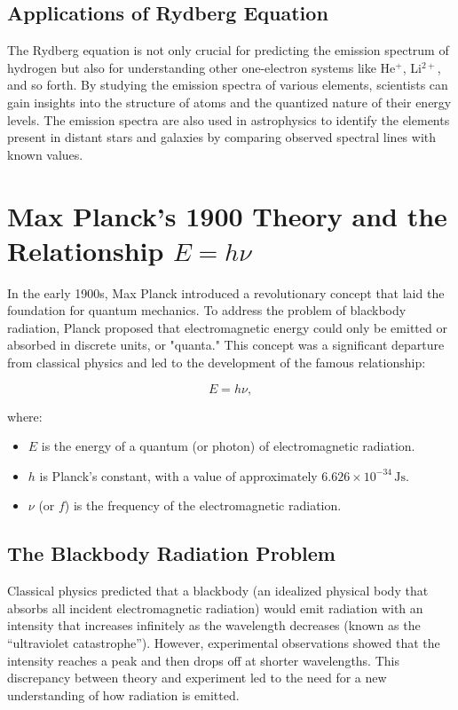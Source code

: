 \documentclass{report}
\begin{document}
\subsection{Applications of Rydberg Equation}

The Rydberg equation is not only crucial for predicting the emission spectrum of hydrogen but also for understanding other one-electron systems like He$^+$, Li$^{2+}$, and so forth. By studying the emission spectra of various elements, scientists can gain insights into the structure of atoms and the quantized nature of their energy levels. The emission spectra are also used in astrophysics to identify the elements present in distant stars and galaxies by comparing observed spectral lines with known values.

\section{Max Planck’s 1900 Theory and the Relationship $E = h\nu$}

In the early 1900s, Max Planck introduced a revolutionary concept that laid the foundation for quantum mechanics. To address the problem of blackbody radiation, Planck proposed that electromagnetic energy could only be emitted or absorbed in discrete units, or "quanta." This concept was a significant departure from classical physics and led to the development of the famous relationship:

\[
	E = h \nu,
\]

where:
\begin{itemize}
	\item $E$ is the energy of a quantum (or photon) of electromagnetic radiation.
	\item $h$ is Planck’s constant, with a value of approximately $6.626 \times 10^{-34} \, \text{Js}$.
	\item $\nu$ (or $f$) is the frequency of the electromagnetic radiation.
\end{itemize}

\subsection{The Blackbody Radiation Problem}

Classical physics predicted that a blackbody (an idealized physical body that absorbs all incident electromagnetic radiation) would emit radiation with an intensity that increases infinitely as the wavelength decreases (known as the “ultraviolet catastrophe”). However, experimental observations showed that the intensity reaches a peak and then drops off at shorter wavelengths. This discrepancy between theory and experiment led to the need for a new understanding of how radiation is emitted.
\end{document}
